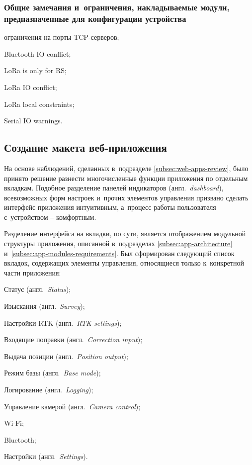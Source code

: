\subsubsection{Общие замечания и~ограничения, накладываемые модули, предназначенные для конфигурации устройства}

\begin{dashitemize}
  \item ограничения на порты TCP-серверов;
  \item Bluetooth IO conflict;
  \item LoRa is only for RS;
  \item LoRa IO conflict;
  \item LoRa local constraints;
  \item Serial IO warnings.
\end{dashitemize}


\subsection{Создание макета веб-приложения}
\label{subsec:app-sketch}

На основе наблюдений, сделанных в~подразделе \ref{subsec:web-apps-review}, было принято решение разнести многочисленные функции приложения по отдельным вкладкам. Подобное разделение панелей индикаторов (англ.~\emph{dashboard}), всевозможных форм настроек и~прочих элементов управления призвано сделать интерфейс приложения интуитивным, а~процесс работы пользователя с~устройством -- комфортным.

Разделение интерфейса на вкладки, по сути, является отображением модульной структуры приложения, описанной в~подразделах \ref{subsec:app-architecture} и~\ref{subsec:app-modules-requirements}. Был сформирован следующий список вкладок, содержащих элементы управления, относящиеся только к~конкретной части приложения:

\begin{dashitemize}
  \item Статус (англ.~\emph{Status});
  \item Изыскания (англ.~\emph{Survey});
  \item Настройки RTK (англ.~\emph{RTK settings});
  \item Входящие поправки (англ.~\emph{Correction input});
  \item Выдача позиции (англ.~\emph{Position output});
  \item Режим базы (англ.~\emph{Base mode});
  \item Логирование (англ.~\emph{Logging});
  \item Управление камерой (англ.~\emph{Camera control});
  \item Wi-Fi;
  \item Bluetooth;
  \item Настройки (англ.~\emph{Settings}).
\end{dashitemize}

\newpage
